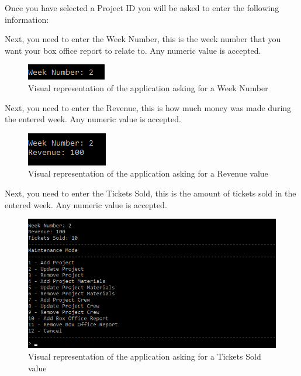\documentclass[
  english,
  a4paper,
,tablecaptionabove
]{scrartcl}
\begin{document}
Once you have selected a Project ID you will be asked to enter the
following information:

Next, you need to enter the Week Number, this is the week number that
you want your box office report to relate to. Any numeric value is
accepted.

\begin{figure}
\centering
\includegraphics{images/user-guide/maintenance-mode/add-box-office-report-week-number.png}
\caption{Visual representation of the application asking for a Week
Number}
\end{figure}

Next, you need to enter the Revenue, this is how much money was made
during the entered week. Any numeric value is accepted.

\begin{figure}
\centering
\includegraphics{images/user-guide/maintenance-mode/add-box-office-report-revenue.png}
\caption{Visual representation of the application asking for a Revenue
value}
\end{figure}

Next, you need to enter the Tickets Sold, this is the amount of tickets
sold in the entered week. Any numeric value is accepted.

\begin{figure}
\centering
\includegraphics{images/user-guide/maintenance-mode/add-box-office-report-tickets-sold.png}
\caption{Visual representation of the application asking for a Tickets
Sold value}
\end{figure}
\end{document}

